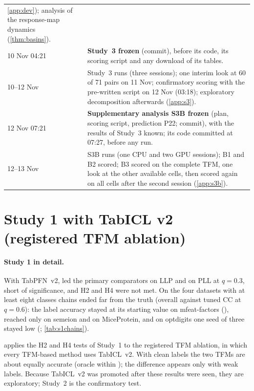 \begin{table}[!htbp]
\begin{tabular}{@{}lp{}@{}}
\cref{app:dev}); analysis of the response-map dynamics (\cref{thm:basins}). \\
10 Nov 04:21 & \textbf{Study~3 frozen} (commit), before its code, its scoring script and any download of its tables. \\
10--12 Nov & Study~3 runs (three sessions); one interim look at 60 of 71 pairs on 11 Nov; confirmatory scoring with the
pre-written script on 12 Nov (03:18); exploratory decomposition afterwards (\cref{app:s3}). \\
12 Nov 07:21 & \textbf{Supplementary analysis S3B frozen} (plan, scoring script, prediction P22; commit), with the
results of Study~3 known; its code committed at 07:27, before any run. \\
12--13 Nov & S3B runs (one CPU and two GPU sessions); B1 and B2 scored; B3 scored on the complete TFM, one look at the
other available cells, then scored again on all cells after the second session (\cref{app:s3b}). \\
\bottomrule
\end{tabular}
\end{table}

\FloatBarrier
\section{Study 1 with TabICL v2 (registered TFM ablation)}\label{app:s1-tabicl}
\paragraph{Study 1 in detail.} With TabPFN~v2, \ours{} led the primary comparators on LLP and on PLL at $q=0.3$, short
of significance, and H2 and H4 were not met. On the four datasets with at least eight classes chains ended far from the
truth (overall  against tuned CC at $q=0.6$): the label accuracy stayed at its starting value on
mfeat-factors (), reached only  on semeion and 
on MiceProtein, and on optdigits one seed of three stayed low (; \cref{tab:s1chains}).

 applies the H2 and H4 tests of Study~1 to the registered TFM ablation, in which every TFM-based method
uses TabICL~v2. With clean labels the two TFMs are about equally accurate (oracle within ); the difference appears only
with weak labels. Because TabICL~v2 was promoted after these results were seen, they are exploratory; Study~2 is the
confirmatory test.
\begin{table}[!htbp]
\centering
\caption{Study~1 datasets, TabICL~v2 for all TFM-based methods (exploratory). Same tests and comparators as
\cref{tab:main}.}
\label{tab:s1tabicl}
\small
\resizebox{\textwidth}{!}{}
\end{table}


